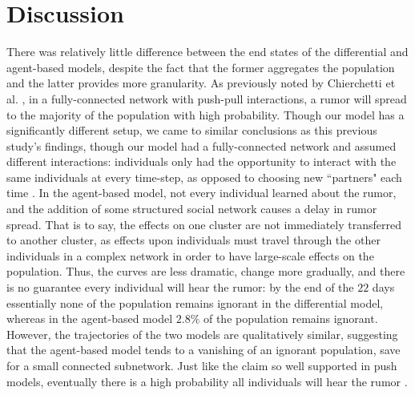 \section{Discussion }
\label{sec:discussion}

There was relatively little difference between the end states of the differential and agent-based models, despite the fact that the former aggregates the population and the latter provides more granularity. As previously noted by Chierchetti et al. \cite{chierchetti-2010}, in a fully-connected network with push-pull interactions, a rumor will spread to the majority of the population with high probability. Though our model has a significantly different setup, we came to similar conclusions as this previous study's findings, though our model had a fully-connected network and assumed different interactions: individuals only had the opportunity to interact with the same individuals at every time-step, as opposed to choosing new ``partners" each time \cite{chierchetti-2010}. In the agent-based model, not every individual learned about the rumor, and the addition of some structured social network causes a delay in rumor spread. That is to say, the effects on one cluster are not immediately transferred to another cluster, as effects upon individuals must travel through the other individuals in a complex network in order to have large-scale effects on the population. Thus, the curves are less dramatic, change more gradually, and there is no guarantee every individual will hear the rumor: by the end of the $ 22 $ days essentially none of the population remains ignorant in the differential model, whereas in the agent-based model $ 2.8\% $ of the population remains ignorant. However, the trajectories of the two models are qualitatively similar, suggesting that the agent-based model tends to a vanishing of an ignorant population, save for a small connected subnetwork. Just like the claim so well supported in push models, eventually there is a high probability all individuals will hear the rumor \cite{pittel-1987, angelopoulos-2009}.

